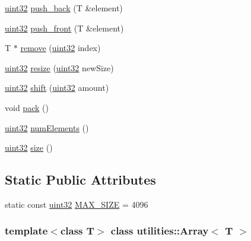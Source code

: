 \begin{DoxyCompactItemize}
\hyperlink{namespacecompatibility_a51e8fe2956b4f39fe1fae96cec0d8393}{uint32} \hyperlink{classutilities_1_1Array_afff43b9291e14459d766aa2198957935}{push\_\-back} (T \&element)
\item 
\hyperlink{namespacecompatibility_a51e8fe2956b4f39fe1fae96cec0d8393}{uint32} \hyperlink{classutilities_1_1Array_afd8ca415457f6f80df84df434f794d61}{push\_\-front} (T \&element)
\item 
T $\ast$ \hyperlink{classutilities_1_1Array_a0afb4cb3ddd8df9baf9eb2ab368487e6}{remove} (\hyperlink{namespacecompatibility_a51e8fe2956b4f39fe1fae96cec0d8393}{uint32} index)
\item 
\hyperlink{namespacecompatibility_a51e8fe2956b4f39fe1fae96cec0d8393}{uint32} \hyperlink{classutilities_1_1Array_af58620515c146b816896bc452cc322c7}{resize} (\hyperlink{namespacecompatibility_a51e8fe2956b4f39fe1fae96cec0d8393}{uint32} newSize)
\item 
\hyperlink{namespacecompatibility_a51e8fe2956b4f39fe1fae96cec0d8393}{uint32} \hyperlink{classutilities_1_1Array_a6966400b958a33d8a9f9407fb3758d26}{shift} (\hyperlink{namespacecompatibility_a51e8fe2956b4f39fe1fae96cec0d8393}{uint32} amount)
\item 
void \hyperlink{classutilities_1_1Array_a7386319f6251d24fe29dcaa188219408}{pack} ()
\item 
\hyperlink{namespacecompatibility_a51e8fe2956b4f39fe1fae96cec0d8393}{uint32} \hyperlink{classutilities_1_1Array_a11ed0767a3195ffb0a5a696ab5791189}{numElements} ()
\item 
\hyperlink{namespacecompatibility_a51e8fe2956b4f39fe1fae96cec0d8393}{uint32} \hyperlink{classutilities_1_1Array_abd1f453f78da95540b08ae85f617c7bb}{size} ()
\end{DoxyCompactItemize}
\subsection*{Static Public Attributes}
\begin{DoxyCompactItemize}
\item 
static const \hyperlink{namespacecompatibility_a51e8fe2956b4f39fe1fae96cec0d8393}{uint32} \hyperlink{classutilities_1_1Array_a0ec9a6526288ee39d905b1caf79b0ddd}{MAX\_\-SIZE} = 4096
\end{DoxyCompactItemize}
\subsubsection*{template$<$class T$>$ class utilities::Array$<$ T $>$}



